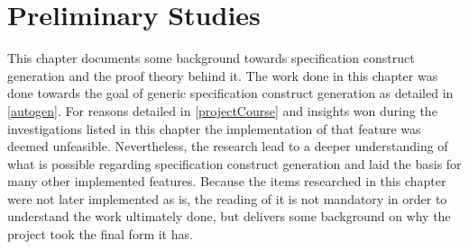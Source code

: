 \section{Preliminary Studies}
This chapter documents some background towards specification construct generation and the proof theory behind it. The work done in this chapter was done towards the goal of generic specification construct generation as detailed in \ref{autogen}. For reasons detailed in \ref{projectCourse} and insights won during the investigations listed in this chapter the implementation of that feature was deemed unfeasible. Nevertheless, the research lead to a deeper understanding of what is possible regarding specification construct generation and laid the basis for many other implemented features. Because the items researched in this chapter were not later implemented as is, the reading of it is not mandatory in order to understand the work ultimately done, but delivers some background on why the project took the final form it has.

